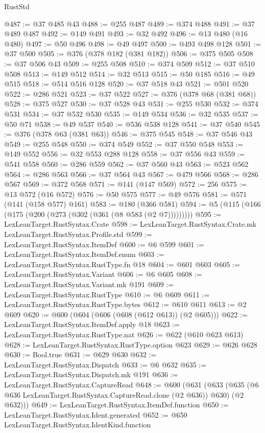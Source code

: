 \begin{lexlean}{RustStd}
\begin{coremodule}
{\begin{coremodule}
{{{{{{{{{{{{@487 := @37 @485 @43
@488 := @255 @487
@489 := @374 @488
@491 := @37 @489 @487
@492 := @149 @491
@493 := @32 @492
@496 := @13 @480 (@16 @480)
@497 := @50 @496
@498 := @49 @497
@500 := @493 @498 @128
@501 := @37 @500
@505 := @376 (@378 @182 (@381 @182))
@506 := @375 @505
@508 := @37 @506 @43
@509 := @255 @508
@510 := @374 @509
@512 := @37 @510 @508
@513 := @149 @512
@514 := @32 @513
@515 := @50 @185
@516 := @49 @515
@518 := @514 @516 @128
@520 := @37 @518 @43
@521 := @501 @520
@522 := @286 @521
@523 := @37 @522
@527 := @376 (@378 @68 (@381 @68))
@528 := @375 @527
@530 := @37 @528 @43
@531 := @255 @530
@532 := @374 @531
@534 := @37 @532 @530
@535 := @149 @534
@536 := @32 @535
@537 := @50 @71
@538 := @49 @537
@540 := @536 @538 @128
@541 := @37 @540
@545 := @376 (@378 @63 (@381 @63))
@546 := @375 @545
@548 := @37 @546 @43
@549 := @255 @548
@550 := @374 @549
@552 := @37 @550 @548
@553 := @149 @552
@556 := @32 @553 @288 @128
@558 := @37 @556 @43
@559 := @541 @558
@560 := @286 @559
@562 := @37 @560 @43
@563 := @523 @562
@564 := @286 @563
@566 := @37 @564 @43
@567 := @479 @566
@568 := @286 @567
@569 := @372 @568
@571 := @141 (@147 @569)
@572 := 256
@575 := @13 @572 (@16 @572)
@576 := @50 @575
@577 := @49 @576
@581 := @571 (@141 (@158 @577) @161)
@583 := @180 (@366 @581)
@594 := @5 (@115 (@166 (@175 (@200 (@273 (@302 (@361 (@8 @583 (@2 @7)))))))))
@595 := LexLeanTarget.RustSyntax.Crate
@598 := LexLeanTarget.RustSyntax.Crate.mk LexLeanTarget.RustSyntax.Profile.std
@599 := LexLeanTarget.RustSyntax.ItemDef
@600 := @6 @599
@601 := LexLeanTarget.RustSyntax.ItemDef.enum
@603 := LexLeanTarget.RustSyntax.RustType.fn @18
@604 := @601 @603
@605 := LexLeanTarget.RustSyntax.Variant
@606 := @6 @605
@608 := LexLeanTarget.RustSyntax.Variant.mk @191
@609 := LexLeanTarget.RustSyntax.RustType
@610 := @6 @609
@611 := LexLeanTarget.RustSyntax.RustType.bytes
@612 := @610 @611
@613 := @2 @609
@620 := @600 (@604 (@606 (@608 (@612 @613)) (@2 @605)))
@622 := LexLeanTarget.RustSyntax.ItemDef.apply @18
@623 := LexLeanTarget.RustSyntax.RustType.nat
@626 := @622 (@610 @623 @613)
@628 := LexLeanTarget.RustSyntax.RustType.option @623
@629 := @626 @628
@630 := Bool.true
@631 := @629 @630
@632 := LexLeanTarget.RustSyntax.Dispatch
@633 := @6 @632
@635 := LexLeanTarget.RustSyntax.Dispatch.mk @191
@636 := LexLeanTarget.RustSyntax.CaptureRead
@648 := @600
    (@631
      (@633 (@635 (@6 @636 LexLeanTarget.RustSyntax.CaptureRead.clone (@2 @636)) @630) (@2 @632)))
@649 := LexLeanTarget.RustSyntax.ItemDef.function
@650 := LexLeanTarget.RustSyntax.Ident.generated
@652 := @650 LexLeanTarget.RustSyntax.IdentKind.function
}}}}}}}}}}}}
\end{coremodule}}
\end{coremodule}
\end{lexlean}
